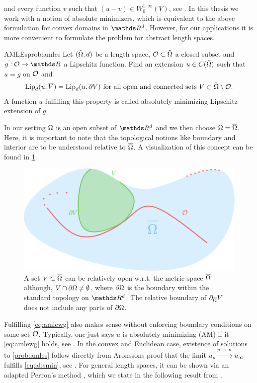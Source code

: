 %
and every function $v$ such that $(u-v)\in W^{1,\infty}_0(V)$, see \cite{aronsson1967extension}. In this thesis we work with a notion of absolute minimizers, which is equivalent to the above formulation for convex domains in $\R^d$. However, for our applications it is more convenient to formulate the problem for abstract length spaces.
%
\begin{problem}{AMLEs}{prob:amles}
Let $(\tilde{\Omega}, d)$ be a length space, $\mathcal{O}\subset\tilde{\Omega}$ a closed subset and $g:\conset\to\R$ a Lipschitz function. Find an extension $u\in C(\tilde{\Omega})$ such that $u=g$ on $\mathcal{O}$ and
%
\begin{align}\label{eq:amlewg}
\operatorname{Lip}_d(u; \overline{V}) = \operatorname{Lip}_d(u, \partial V) \text{ for all open and connected sets } V\subset \tilde{\Omega}\setminus \mathcal{O}.
\end{align}
%
A function $u$ fulfilling this property is called absolutely minimizing Lipschitz extension of $g$.
\end{problem}
%
\begin{remark}{}{}
In our setting $\Omega$ is an open subset of $\R^d$ and we then choose $\tilde{\Omega} = \overline{\Omega}$. Here, it is important to note that 
the topological notions like boundary and interior are to be understood relative to $\overline{\Omega}$. A visualization of this concept can be found in \cref{fig:relb}.
\end{remark}
%
\begin{figure}
\begin{center}
\includegraphics[width=.5\textwidth]{atelier/SSL/relboundary.pdf}
\end{center}
\caption[Visualization of the relative boundary.]{A set $V\subset\overline{\Omega}$ can be relatively open w.r.t. the metric space $\overline{\Omega}$ although, $V\cap\partial\Omega \neq\emptyset$, where $\partial \Omega$ is the boundary within the standard topology on $\R^d$. The relative boundary of $\partial_{\overline{\Omega}} V$ does not include any parts of $\partial \Omega$.}\label{fig:relb}
\end{figure}
%
%
\noindent%
Fulfilling \cref{eq:amlewg} also makes sense without enforcing boundary conditions on some set $\mathcal{O}$. Typically, one just says $u$ is absolutely minimizing (AM) if it \cref{eq:amlewg} holds, see \cite{aronsson2004tour}. In the convex and Euclidean case, existence of solutions to \cref{prob:amles} follow directly from Aronssons proof that the limit $u_p\xrightarrow{p\to\infty} u_\infty$ fulfills \cref{eq:absmin}, see \cite{aronsson1967extension}. For general length spaces, it can be shown via an adapted Perron's method \cite{perron1923neue}, which we state in the following result from \cite{juutinen2002absolutely}.

